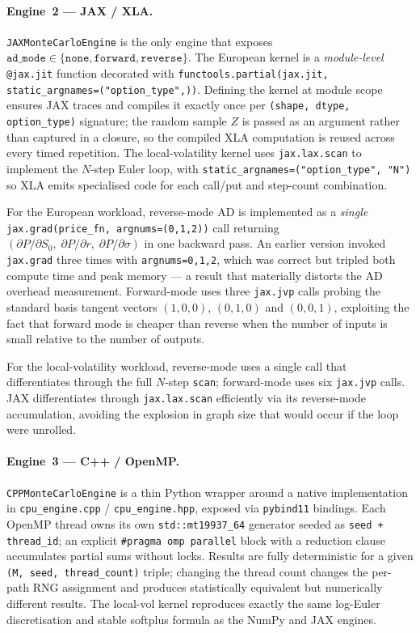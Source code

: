 \paragraph{Engine~2 --- JAX / XLA.}
\texttt{JAXMonteCarloEngine} is the only engine that exposes
\(\texttt{ad\_mode} \in \{\texttt{none}, \texttt{forward}, \texttt{reverse}\}\).
The European kernel is a
\emph{module-level} \texttt{@jax.jit} function decorated with
\texttt{functools.partial(jax.jit, static\_argnames=("option\_type",))}. Defining
the kernel at module scope ensures JAX traces and compiles it exactly once per
\texttt{(shape, dtype, option\_type)} signature; the random sample $Z$ is passed
as an argument rather than captured in a closure, so the compiled XLA
computation is reused across every timed repetition. The local-volatility
kernel uses \texttt{jax.lax.scan} to implement the $N$-step Euler loop, with
\texttt{static\_argnames=("option\_type", "N")} so XLA emits specialised code
for each call/put and step-count combination.

For the European workload, reverse-mode AD is implemented as a \emph{single}
\texttt{jax.grad(price\_fn, argnums=(0,1,2))} call returning
$(\partial P/\partial S_0,\; \partial P/\partial r,\; \partial P/\partial \sigma)$
in one backward pass. An earlier version invoked \texttt{jax.grad} three times
with \texttt{argnums=0,1,2}, which was correct but tripled both compute time and
peak memory --- a result that materially distorts the AD overhead measurement.
Forward-mode uses three \texttt{jax.jvp} calls probing the standard basis tangent
vectors $(1,0,0)$, $(0,1,0)$ and $(0,0,1)$, exploiting the fact that forward mode
is cheaper than reverse when the number of inputs is small relative to the
number of outputs.

For the local-volatility workload, reverse-mode uses a single
 call that differentiates through
the full $N$-step \texttt{scan}; forward-mode uses six \texttt{jax.jvp} calls.
JAX differentiates through \texttt{jax.lax.scan} efficiently via its
reverse-mode accumulation, avoiding the explosion in graph size that would
occur if the loop were unrolled.

\paragraph{Engine~3 --- C++ / OpenMP.}
\texttt{CPPMonteCarloEngine} is a thin Python wrapper around a native
implementation in \texttt{cpu\_engine.cpp} / \texttt{cpu\_engine.hpp}, exposed via
\texttt{pybind11} bindings. Each OpenMP thread owns its own \texttt{std::mt19937\_64}
generator seeded as \texttt{seed + thread\_id}; an explicit \texttt{\#pragma omp
parallel} block with a reduction clause accumulates partial sums without locks.
Results are fully deterministic for a given \texttt{(M, seed, thread\_count)}
triple; changing the thread count changes the per-path RNG assignment and produces
statistically equivalent but numerically different results. The local-vol kernel
reproduces exactly the same log-Euler discretisation and stable softplus formula
as the NumPy and JAX engines.

